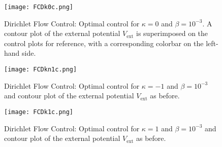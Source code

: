 \begin{figure}[h]
	\centering
	\texttt{[image: FCDk0c.png]}
	\caption{Dirichlet Flow Control: Optimal control for $\kappa = 0$ and $\beta = 10^{-3}$. A contour plot of the external potential \emph{$V_{\text{ext}}$} is superimposed on the control plots for reference, with a corresponding colorbar on the left-hand side.} 
	\label{F5ac}
\end{figure}
\begin{figure}[h]
	\centering
	\texttt{[image: FCDkn1c.png]}
	\caption{Dirichlet Flow Control: Optimal control for $\kappa = -1$ and $\beta = 10^{-3}$ and contour plot of the external potential \emph{$V_{\text{ext}}$} as before.} 
	\label{F5bc}
\end{figure}
\begin{figure}[h]
	\centering
	\texttt{[image: FCDk1c.png]}
	\caption{Dirichlet Flow Control: Optimal control for $\kappa = 1$ and $\beta = 10^{-3}$ and contour plot of the external potential \emph{$V_{\text{ext}}$} as before.} 
	\label{F5cc}
\end{figure}

